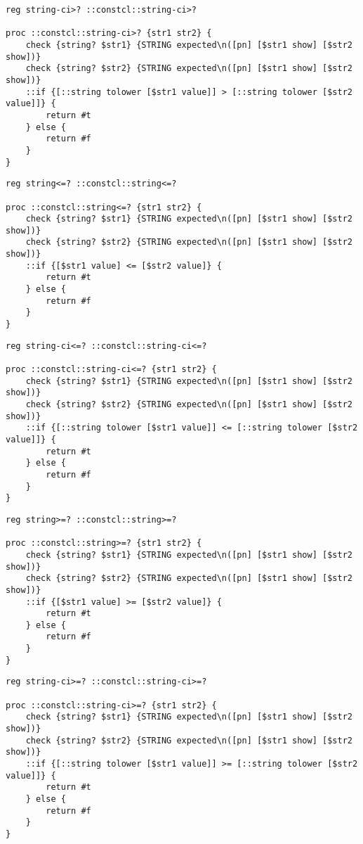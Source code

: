 \documentclass{report}
\begin{document}
\noindent\makebox[\linewidth]{\rule{\linewidth}{0.4pt}}
\noindent\makebox[\linewidth]{\rule{\linewidth}{0.4pt}}
\begin{lstlisting}
reg string-ci>? ::constcl::string-ci>?
 
proc ::constcl::string-ci>? {str1 str2} {
    check {string? $str1} {STRING expected\n([pn] [$str1 show] [$str2 show])}
    check {string? $str2} {STRING expected\n([pn] [$str1 show] [$str2 show])}
    ::if {[::string tolower [$str1 value]] > [::string tolower [$str2 value]]} {
        return #t
    } else {
        return #f
    }
}
\end{lstlisting}
\noindent\makebox[\linewidth]{\rule{\linewidth}{0.4pt}}
\noindent\makebox[\linewidth]{\rule{\linewidth}{0.4pt}}
\begin{lstlisting}
reg string<=? ::constcl::string<=?
 
proc ::constcl::string<=? {str1 str2} {
    check {string? $str1} {STRING expected\n([pn] [$str1 show] [$str2 show])}
    check {string? $str2} {STRING expected\n([pn] [$str1 show] [$str2 show])}
    ::if {[$str1 value] <= [$str2 value]} {
        return #t
    } else {
        return #f
    }
}
\end{lstlisting}
\noindent\makebox[\linewidth]{\rule{\linewidth}{0.4pt}}
\noindent\makebox[\linewidth]{\rule{\linewidth}{0.4pt}}
\begin{lstlisting}
reg string-ci<=? ::constcl::string-ci<=?
 
proc ::constcl::string-ci<=? {str1 str2} {
    check {string? $str1} {STRING expected\n([pn] [$str1 show] [$str2 show])}
    check {string? $str2} {STRING expected\n([pn] [$str1 show] [$str2 show])}
    ::if {[::string tolower [$str1 value]] <= [::string tolower [$str2 value]]} {
        return #t
    } else {
        return #f
    }
}
\end{lstlisting}
\noindent\makebox[\linewidth]{\rule{\linewidth}{0.4pt}}
\noindent\makebox[\linewidth]{\rule{\linewidth}{0.4pt}}
\begin{lstlisting}
reg string>=? ::constcl::string>=?
 
proc ::constcl::string>=? {str1 str2} {
    check {string? $str1} {STRING expected\n([pn] [$str1 show] [$str2 show])}
    check {string? $str2} {STRING expected\n([pn] [$str1 show] [$str2 show])}
    ::if {[$str1 value] >= [$str2 value]} {
        return #t
    } else {
        return #f
    }
}
\end{lstlisting}
\noindent\makebox[\linewidth]{\rule{\linewidth}{0.4pt}}
\noindent\makebox[\linewidth]{\rule{\linewidth}{0.4pt}}
\begin{lstlisting}
reg string-ci>=? ::constcl::string-ci>=?
 
proc ::constcl::string-ci>=? {str1 str2} {
    check {string? $str1} {STRING expected\n([pn] [$str1 show] [$str2 show])}
    check {string? $str2} {STRING expected\n([pn] [$str1 show] [$str2 show])}
    ::if {[::string tolower [$str1 value]] >= [::string tolower [$str2 value]]} {
        return #t
    } else {
        return #f
    }
}
\end{lstlisting}
\noindent\makebox[\linewidth]{\rule{\linewidth}{0.4pt}}
\end{document}
